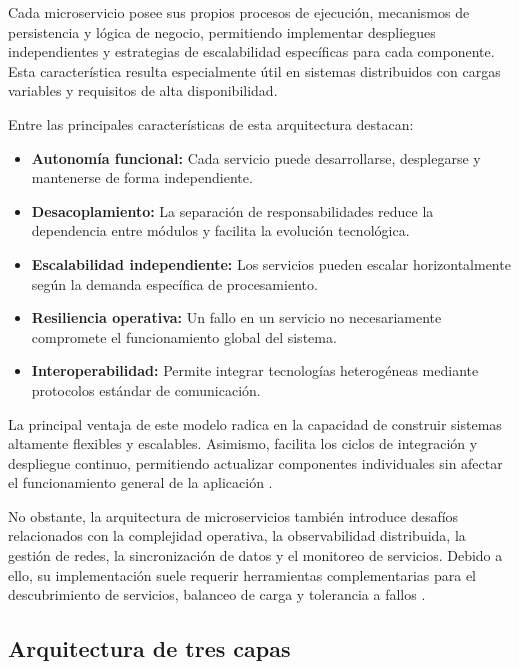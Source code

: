 Cada microservicio posee sus propios procesos de ejecución, mecanismos de persistencia y lógica de negocio, permitiendo implementar despliegues independientes y estrategias de escalabilidad específicas para cada componente. Esta característica resulta especialmente útil en sistemas distribuidos con cargas variables y requisitos de alta disponibilidad.

Entre las principales características de esta arquitectura destacan:

\begin{itemize}
\item \textbf{Autonomía funcional:} Cada servicio puede desarrollarse, desplegarse y mantenerse de forma independiente.

\item \textbf{Desacoplamiento:} La separación de responsabilidades reduce la dependencia entre módulos y facilita la evolución tecnológica.

\item \textbf{Escalabilidad independiente:} Los servicios pueden escalar horizontalmente según la demanda específica de procesamiento.

\item \textbf{Resiliencia operativa:} Un fallo en un servicio no necesariamente compromete el funcionamiento global del sistema.

\item \textbf{Interoperabilidad:} Permite integrar tecnologías heterogéneas mediante protocolos estándar de comunicación.
\end{itemize}

La principal ventaja de este modelo radica en la capacidad de construir sistemas altamente flexibles y escalables. Asimismo, facilita los ciclos de integración y despliegue continuo, permitiendo actualizar componentes individuales sin afectar el funcionamiento general de la aplicación \cite{32}.

No obstante, la arquitectura de microservicios también introduce desafíos relacionados con la complejidad operativa, la observabilidad distribuida, la gestión de redes, la sincronización de datos y el monitoreo de servicios. Debido a ello, su implementación suele requerir herramientas complementarias para el descubrimiento de servicios, balanceo de carga y tolerancia a fallos \cite{32}.

\subsection{Arquitectura de tres capas}

